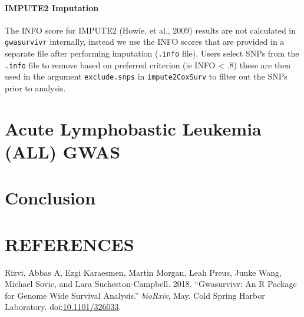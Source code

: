 \documentclass[]{DissertateUSU}
\begin{document}
\subsubsection{IMPUTE2 Imputation}\label{impute2-imputation}

The INFO score for IMPUTE2 (Howie, et al., 2009) results are not
calculated in \texttt{gwasurvivr} internally, instead we use the INFO
scores that are provided in a separate file after performing imputation
(\texttt{.info} file). Users select SNPs from the \texttt{.info} file to
remove based on preferred criterion (ie INFO \textless{} .8) these are
then used in the argument \texttt{exclude.snps} in
\texttt{impute2CoxSurv} to filter out the SNPs prior to analysis.

\FloatBarrier

\newpage

\pagestyle{plain} \fancyhead[L]{} \fancyhead[R]{}
\fancyfoot[C]{\thepage}

\chapter{Acute Lymphobastic Leukemia (ALL) GWAS}

\FloatBarrier

\newpage

\pagestyle{plain} \fancyhead[L]{} \fancyhead[R]{}
\fancyfoot[C]{\thepage}

\chapter{Conclusion}

\FloatBarrier
\newpage
\pagestyle{plain} \fancyhead[L]{} \fancyhead[R]{}
\fancyfoot[C]{\thepage}

\chapter*{REFERENCES}

\singlespacing
\setlength{\parindent}{-0.5in} \setlength{\leftskip}{0.4in}
\setlength{\parskip}{6pt} \noindent

\hypertarget{refs}{}
\hypertarget{ref-Rizvi_2018}{}
Rizvi, Abbas A, Ezgi Karaesmen, Martin Morgan, Leah Preus, Junke Wang,
Michael Sovic, and Lara Sucheston-Campbell. 2018. ``Gwasurvivr: An R
Package for Genome Wide Survival Analysis.'' \emph{bioRxiv}, May. Cold
Spring Harbor Laboratory.
doi:\href{https://doi.org/10.1101/326033}{10.1101/326033}.
\end{document}
